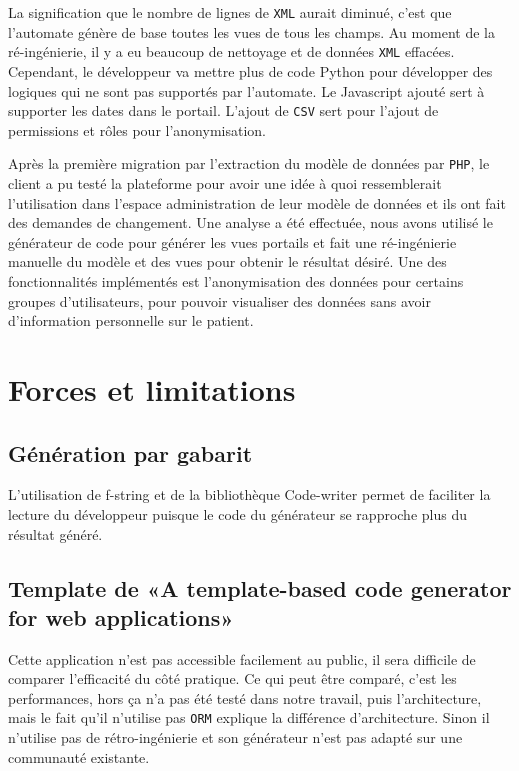 La signification que le nombre de lignes de \texttt{XML} aurait diminué, c’est que l’automate génère de base toutes les vues de tous les champs. Au moment de la ré-ingénierie, il y a eu beaucoup de nettoyage et de données \texttt{XML} effacées. Cependant, le développeur va mettre plus de code Python pour développer des logiques qui ne sont pas supportés par l’automate. Le Javascript ajouté sert à supporter les dates dans le portail. L’ajout de \texttt{CSV} sert pour l’ajout de permissions et rôles pour l’anonymisation.

Après la première migration par l’extraction du modèle de données par \texttt{PHP}, le client a pu testé la plateforme pour avoir une idée à quoi ressemblerait l’utilisation dans l’espace administration de leur modèle de données et ils ont fait des demandes de changement. Une analyse a été effectuée, nous avons utilisé le générateur de code pour générer les vues portails et fait une ré-ingénierie manuelle du modèle et des vues pour obtenir le résultat désiré. Une des fonctionnalités implémentés est l’anonymisation des données pour certains groupes d’utilisateurs, pour pouvoir visualiser des données sans avoir d’information personnelle sur le patient.

\section{Forces et limitations}

\subsection{Génération par gabarit}

L’utilisation de f-string et de la bibliothèque Code-writer permet de faciliter la lecture du développeur puisque le code du générateur se rapproche plus du résultat généré.

\subsection{Template de «A template-based code generator for web applications»}
Cette application n’est pas accessible facilement au public, il sera difficile de comparer l’efficacité du côté pratique. Ce qui peut être comparé, c’est les performances, hors ça n’a pas été testé dans notre travail, puis l’architecture, mais le fait qu’il n’utilise pas \texttt{ORM} explique la différence d’architecture. Sinon il n’utilise pas de rétro-ingénierie et son générateur n’est pas adapté sur une communauté existante.

